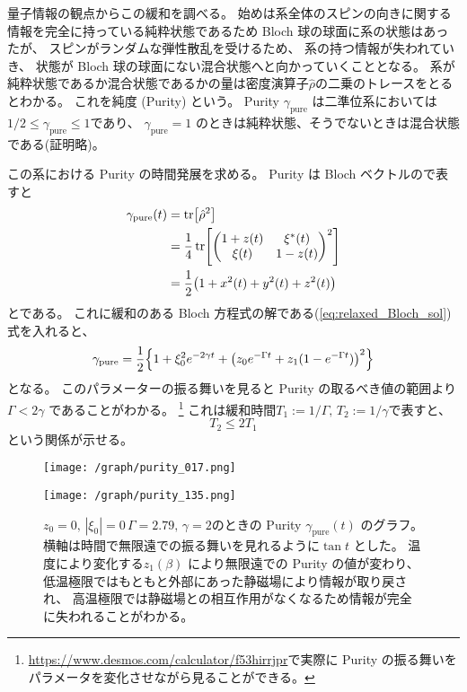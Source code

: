\documentclass[11pt,dvipdfmx,a4paper]{jsarticle}
\begin{document}
量子情報の観点からこの緩和を調べる。
始めは系全体のスピンの向きに関する情報を完全に持っている純粋状態であるため Bloch 球の球面に系の状態はあったが、
スピンがランダムな弾性散乱を受けるため、
系の持つ情報が失われていき、
状態が Bloch 球の球面にない混合状態へと向かっていくこととなる。
系が純粋状態であるか混合状態であるかの量は密度演算子\(\hat{\rho}\)の二乗のトレースをとるとわかる。
これを純度 (Purity) という。
 Purity \(\gamma_{\text{pure}}\) は二準位系においては\(1/2 \leq \gamma_{\text{pure}}\leq 1\)であり、
 \(\gamma_{\text{pure}} = 1\) のときは純粋状態、そうでないときは混合状態である(証明略)。

この系における Purity の時間発展を求める。
Purity は Bloch ベクトルので表すと
\begin{align}
	\gamma_{\text{pure}}(t) &= \tr[\hat{\rho}^2] \notag\\
	&=\frac{1}{4}\tr[
		\begin{pmatrix}
			1 + z(t) & \xi^*(t)\\
			\xi(t) & 1 - z(t)
		\end{pmatrix}^2]\notag\\
	&=\frac{1}{2}\qty(1+x^2(t)+y^2(t)+z^2(t)) \notag\\
\end{align}
とである。
これに緩和のある Bloch 方程式の解である(\ref{eq:relaxed_Bloch_sol})式を入れると、
\begin{equation}
	\gamma_{\text{pure}} = \frac{1}{2}\Bigl\{1+\xi_0^2e^{-2\gamma t}+\qty(z_0 e^{-\Gamma t} + z_{1}(1-e^{-\Gamma t}))^2\Bigr\}
\end{equation}
となる。
このパラメーターの振る舞いを見ると Purity の取るべき値の範囲より\(\Gamma < 2\gamma\) であることがわかる。
\footnote{\url{https://www.desmos.com/calculator/f53hirrjpr}で実際に Purity の振る舞いをパラメータを変化させながら見ることができる。}
これは緩和時間\(T_1 := 1/\Gamma,\,T_2 := 1/\gamma\)で表すと、
\begin{equation}
	T_2 \le 2T_1
\end{equation}
という関係が示せる。

\begin{figure}[htb]
	\centering
	\begin{minipage}[t]{0.48\columnwidth}
		\centering
		\texttt{[image: /graph/purity\_017.png]}
	\end{minipage}
	\hfill
	\begin{minipage}[t]{0.48\columnwidth}
		\centering
		\texttt{[image: /graph/purity\_135.png]}
	\end{minipage}
	\caption{\(z_0 = 0,\, |\xi_0|=0\,\Gamma=2.79,\,\gamma=2\)のときの
	 Purity \(\gamma_{\text{pure}}(t)\) のグラフ。
	 横軸は時間で無限遠での振る舞いを見れるように\(\tan t\) とした。
	 温度により変化する\(z_{1}(\beta)\) により無限遠での Purity の値が変わり、
	 低温極限ではもともと外部にあった静磁場により情報が取り戻され、
	 高温極限では静磁場との相互作用がなくなるため情報が完全に失われることがわかる。}
	 \label{graph:purity}
\end{figure}
\end{document}
